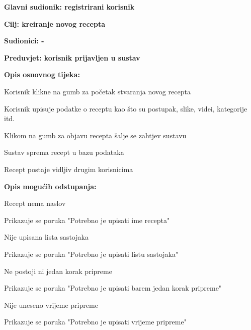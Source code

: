 				
					\noindent {}
					\begin{packed_item}
						\item \textbf{Glavni sudionik: registrirani korisnik}
						\item  \textbf{Cilj: kreiranje novog recepta}
						\item  \textbf{Sudionici: -}
						\item  \textbf{Preduvjet: korisnik prijavljen u sustav}
						
						\item  \textbf{Opis osnovnog tijeka:}
						\item[] \begin{packed_enum}
							\item Korisnik klikne na gumb za početak stvaranja novog recepta
							\item Korisnik upisuje podatke o receptu kao što su postupak, slike, videi, kategorije itd.
							\item Klikom na gumb za objavu recepta šalje se zahtjev sustavu
							\item Sustav sprema recept u bazu podataka
							\item Recept postaje vidljiv drugim korisnicima
						\end{packed_enum}
						
						\item  \textbf{Opis mogućih odstupanja:}
						\item[] \begin{packed_item}
							\item[3.a] Recept nema naslov
							\begin{packed_enum}
								\item Prikazuje se poruka "Potrebno je upisati ime recepta"
							\end{packed_enum}
							\item[3.b] Nije upisana lista sastojaka
							\begin{packed_enum}
								\item Prikazuje se poruka "Potrebno je upisati listu sastojaka"
							\end{packed_enum}
							\item[3.c] Ne postoji ni jedan korak pripreme
							\begin{packed_enum}
								\item Prikazuje se poruka "Potrebno je upisati barem jedan korak pripreme"
							\end{packed_enum}
							\item[3.d] Nije uneseno vrijeme pripreme
							\begin{packed_enum}
								\item Prikazuje se poruka "Potrebno je upisati vrijeme pripreme"
							\end{packed_enum}
						\end{packed_item}
					\end{packed_item}



